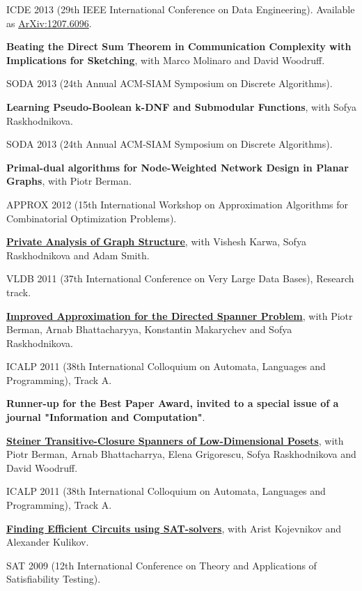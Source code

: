 \documentclass[11pt]{article}
\newenvironment{lonelist}[1][\enskip\textbullet]%
        {\vspace{-\baselineskip}\begin{list}{#1}{%
        \setlength{\partopsep}{0pt}%
        \setlength{\topsep}{0pt}}}
        {\end{list}\vspace{-.6\baselineskip}}
\begin{document}
\begin{lonelist}
ICDE 2013 (29th IEEE International Conference on Data Engineering). Available as \href{http://arxiv.org/pdf/1207.6096.pdf}{ArXiv:1207.6096}.

\item \textbf{Beating the Direct Sum Theorem in Communication Complexity with Implications for Sketching}, with Marco Molinaro and David Woodruff.

SODA 2013 (24th Annual ACM-SIAM Symposium on Discrete Algorithms).

\item \textbf{Learning Pseudo-Boolean k-DNF and Submodular Functions}, with Sofya Raskhodnikova.

SODA 2013 (24th Annual ACM-SIAM Symposium on Discrete Algorithms).

\item \textbf{Primal-dual algorithms for Node-Weighted Network Design in Planar Graphs}, with Piotr Berman.

APPROX 2012 (15th International Workshop on Approximation Algorithms for Combinatorial Optimization Problems).

\item \href{http://grigory.us/files/PrivateGraphStructure-VLDB11.pdf}{
    \textbf{Private Analysis of Graph Structure}},
with Vishesh Karwa, Sofya Raskhodnikova and Adam Smith.

VLDB 2011 (37th International Conference on Very Large Data Bases), Research track.

\item \href{http://grigory.us/files/publications/directed-spanners-journal-submitted.pdf}
{\textbf{Improved Approximation for the Directed Spanner Problem}}, with Piotr Berman, Arnab Bhattacharyya, Konstantin Makarychev and Sofya Raskhodnikova.

ICALP 2011 (38th International Colloquium on Automata, Languages and Programming), Track A. 

\textbf{Runner-up for the Best Paper Award, invited to a special issue of a journal "Information and Computation"}.

\item \href{http://grigory.us/files/steiner-ICALP11.pdf}{\textbf{Steiner Transitive-Closure Spanners of Low-Dimensional Posets}},
with Piotr Berman, Arnab Bhattacharrya, Elena Grigorescu, Sofya Raskhodnikova and David Woodruff.

ICALP 2011 (38th International Colloquium on Automata, Languages and Programming), Track A.

\item \href{http://grigory.us/files/publications/0903_SAT2009_Efficient_Boolean_Circuits.pdf}{\textbf{Finding Efficient Circuits using SAT-solvers}}, with
Arist Kojevnikov and Alexander Kulikov.

SAT 2009 (12th International Conference on Theory and Applications of Satisfiability Testing).

\end{lonelist}
\end{document}
